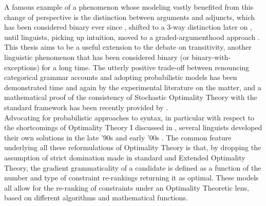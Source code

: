 A famous example of a phenomenon whose modeling vastly benefited from this change of perspective is the distinction between arguments and adjuncts, which has been considered binary ever since \textcite{tesniere2015elements}, shifted to a 3-way distinction later on \parencite{vanvalinlapolla1997syntax, Dowty2003, AldezabalEtAl2003, Villavicencio2002}, until linguists, picking up  intuition, moved to a graded-argumenthood approach \parencite{CennamoLenci2019, KimEtAl2019, KimEtAl2019a, KimEtAl2018}. This thesis aims to be a useful extension to the debate on transitivity, another linguistic phenomenon that has been considered binary (or binary-with-exceptions) for a long time.
The utterly positive trade-off between renouncing categorical grammar accounts and adopting probabilistic models has been demonstrated time and again by the experimental literature on the matter, and a mathematical proof of the consistency of Stochastic Optimality Theory with the standard framework has been recently provided by \textcite{magri2018implicational}. \\
Advocating for probabilistic approaches to syntax, in particular with respect to the shortcomings of Optimality Theory I discussed in , several linguists developed their own solutions in the late '90s and early '00s \parencite{Boersma2004, SoraceKeller2005, Keller2000, Keller2006, AlexopoulouKeller2006, BoersmaHayes2001empirical, keller1998gradient, davidson2003tense}. The common feature underlying all these reformulations of Optimality Theory is that, by dropping the assumption of strict domination made in standard and Extended Optimality Theory, the gradient grammaticality of a candidate is defined as a function of the number and type of constraint re-rankings returning it as optimal. These models all allow for the re-ranking of constraints under an Optimality Theoretic lens, based on different algorithms and mathematical functions.\\
